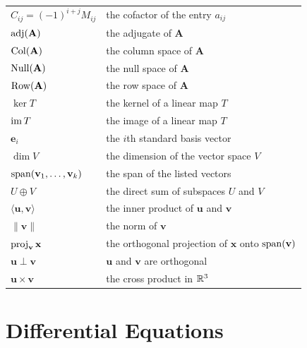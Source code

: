 {\begin{longtable}{@{}L{0.27\textwidth}L{0.65\textwidth}@{}}
        $C_{ij}=(-1)^{i+j}M_{ij}$ & the cofactor of the entry $a_{ij}$ \\
        $\operatorname{adj}(\mathbf{A})$ & the adjugate of $\mathbf{A}$ \\
        $\operatorname{Col}(\mathbf{A})$ & the column space of $\mathbf{A}$ \\
        $\operatorname{Null}(\mathbf{A})$ & the null space of $\mathbf{A}$ \\
        $\operatorname{Row}(\mathbf{A})$ & the row space of $\mathbf{A}$ \\
        $\ker T$ & the kernel of a linear map $T$ \\
        $\operatorname{im} T$ & the image of a linear map $T$ \\
        $\mathbf{e}_i$ & the $i$th standard basis vector \\
        $\dim V$ & the dimension of the vector space $V$ \\
        $\operatorname{span}(\mathbf{v}_1,\dots,\mathbf{v}_k)$ & the span of the listed vectors \\
        $U\oplus V$ & the direct sum of subspaces $U$ and $V$ \\
        $\langle\mathbf{u},\mathbf{v}\rangle$ & the inner product of $\mathbf{u}$ and $\mathbf{v}$ \\
        $\|\mathbf{v}\|$ & the norm of $\mathbf{v}$ \\
        $\operatorname{proj}_{\mathbf{v}}\mathbf{x}$ & the orthogonal projection of $\mathbf{x}$ onto $\operatorname{span}(\mathbf{v})$ \\
        $\mathbf{u}\perp\mathbf{v}$ & $\mathbf{u}$ and $\mathbf{v}$ are orthogonal \\
        $\mathbf{u}\times\mathbf{v}$ & the cross product in $\mathbb{R}^3$ \\
    \end{longtable}
    }

    \section*{Differential Equations}

